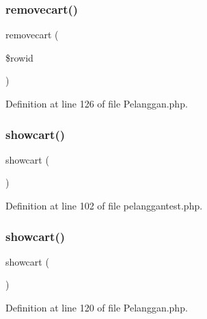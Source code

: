 \subsubsection{\texorpdfstring{removecart()}{removecart()}\hspace{0.1cm}{\footnotesize\ttfamily [2/2]}}
{\footnotesize\ttfamily removecart (\begin{DoxyParamCaption}\item[{}]{\$rowid }\end{DoxyParamCaption})}



Definition at line 126 of file Pelanggan.\+php.

\mbox{\label{class_pelanggan_a31e5e82d730a882fc93614c8e0878d2b}} 
\subsubsection{\texorpdfstring{showcart()}{showcart()}\hspace{0.1cm}{\footnotesize\ttfamily [1/2]}}
{\footnotesize\ttfamily showcart (\begin{DoxyParamCaption}{ }\end{DoxyParamCaption})}



Definition at line 102 of file pelanggantest.\+php.

\mbox{\label{class_pelanggan_a31e5e82d730a882fc93614c8e0878d2b}} 
\subsubsection{\texorpdfstring{showcart()}{showcart()}\hspace{0.1cm}{\footnotesize\ttfamily [2/2]}}
{\footnotesize\ttfamily showcart (\begin{DoxyParamCaption}{ }\end{DoxyParamCaption})}



Definition at line 120 of file Pelanggan.\+php.

\mbox{\label{class_pelanggan_a7f3c2d562afcfc1c3e52bda7637191cf}} 
